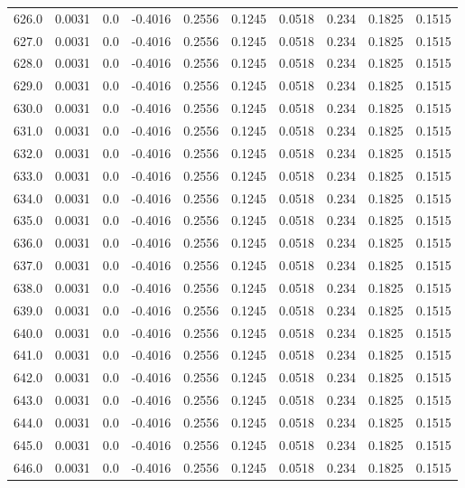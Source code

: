 \begin{longtable}{lrrrrrrrrr}
626.0 & 0.0031 & 0.0 & -0.4016 & 0.2556 & 0.1245 & 0.0518 & 0.234 & 0.1825 & 0.1515 \\
627.0 & 0.0031 & 0.0 & -0.4016 & 0.2556 & 0.1245 & 0.0518 & 0.234 & 0.1825 & 0.1515 \\
628.0 & 0.0031 & 0.0 & -0.4016 & 0.2556 & 0.1245 & 0.0518 & 0.234 & 0.1825 & 0.1515 \\
629.0 & 0.0031 & 0.0 & -0.4016 & 0.2556 & 0.1245 & 0.0518 & 0.234 & 0.1825 & 0.1515 \\
630.0 & 0.0031 & 0.0 & -0.4016 & 0.2556 & 0.1245 & 0.0518 & 0.234 & 0.1825 & 0.1515 \\
631.0 & 0.0031 & 0.0 & -0.4016 & 0.2556 & 0.1245 & 0.0518 & 0.234 & 0.1825 & 0.1515 \\
632.0 & 0.0031 & 0.0 & -0.4016 & 0.2556 & 0.1245 & 0.0518 & 0.234 & 0.1825 & 0.1515 \\
633.0 & 0.0031 & 0.0 & -0.4016 & 0.2556 & 0.1245 & 0.0518 & 0.234 & 0.1825 & 0.1515 \\
634.0 & 0.0031 & 0.0 & -0.4016 & 0.2556 & 0.1245 & 0.0518 & 0.234 & 0.1825 & 0.1515 \\
635.0 & 0.0031 & 0.0 & -0.4016 & 0.2556 & 0.1245 & 0.0518 & 0.234 & 0.1825 & 0.1515 \\
636.0 & 0.0031 & 0.0 & -0.4016 & 0.2556 & 0.1245 & 0.0518 & 0.234 & 0.1825 & 0.1515 \\
637.0 & 0.0031 & 0.0 & -0.4016 & 0.2556 & 0.1245 & 0.0518 & 0.234 & 0.1825 & 0.1515 \\
638.0 & 0.0031 & 0.0 & -0.4016 & 0.2556 & 0.1245 & 0.0518 & 0.234 & 0.1825 & 0.1515 \\
639.0 & 0.0031 & 0.0 & -0.4016 & 0.2556 & 0.1245 & 0.0518 & 0.234 & 0.1825 & 0.1515 \\
640.0 & 0.0031 & 0.0 & -0.4016 & 0.2556 & 0.1245 & 0.0518 & 0.234 & 0.1825 & 0.1515 \\
641.0 & 0.0031 & 0.0 & -0.4016 & 0.2556 & 0.1245 & 0.0518 & 0.234 & 0.1825 & 0.1515 \\
642.0 & 0.0031 & 0.0 & -0.4016 & 0.2556 & 0.1245 & 0.0518 & 0.234 & 0.1825 & 0.1515 \\
643.0 & 0.0031 & 0.0 & -0.4016 & 0.2556 & 0.1245 & 0.0518 & 0.234 & 0.1825 & 0.1515 \\
644.0 & 0.0031 & 0.0 & -0.4016 & 0.2556 & 0.1245 & 0.0518 & 0.234 & 0.1825 & 0.1515 \\
645.0 & 0.0031 & 0.0 & -0.4016 & 0.2556 & 0.1245 & 0.0518 & 0.234 & 0.1825 & 0.1515 \\
646.0 & 0.0031 & 0.0 & -0.4016 & 0.2556 & 0.1245 & 0.0518 & 0.234 & 0.1825 & 0.1515 \\

\end{longtable}
